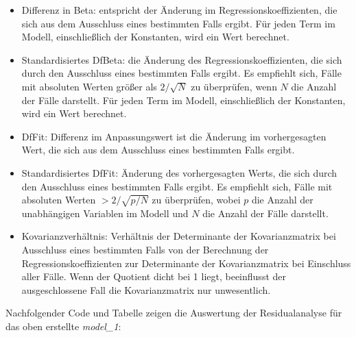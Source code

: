 \documentclass[]{article}
\providecommand{\tightlist}{%
  \setlength{\itemsep}{0pt}\setlength{\parskip}{0pt}}
\begin{document}
\begin{enumerate}
  \begin{itemize}
  \tightlist
  \item
    Differenz in Beta: entspricht der Änderung im
    Regressionskoeffizienten, die sich aus dem Ausschluss eines
    bestimmten Falls ergibt. Für jeden Term im Modell, einschließlich
    der Konstanten, wird ein Wert berechnet.
  \item
    Standardisiertes DfBeta: die Änderung des Regressionskoeffizienten,
    die sich durch den Ausschluss eines bestimmten Falls ergibt. Es
    empfiehlt sich, Fälle mit absoluten Werten größer als \(2/\sqrt{N}\)
    zu überprüfen, wenn \(N\) die Anzahl der Fälle darstellt. Für jeden
    Term im Modell, einschließlich der Konstanten, wird ein Wert
    berechnet.
  \item
    DfFit: Differenz im Anpassungswert ist die Änderung im
    vorhergesagten Wert, die sich aus dem Ausschluss eines bestimmten
    Falls ergibt.
  \item
    Standardisiertes DfFit: Änderung des vorhergesagten Werts, die sich
    durch den Ausschluss eines bestimmten Falls ergibt. Es empfiehlt
    sich, Fälle mit absoluten Werten \(> 2/\sqrt{p/N}\) zu überprüfen,
    wobei \(p\) die Anzahl der unabhängigen Variablen im Modell und
    \(N\) die Anzahl der Fälle darstellt.
  \item
    Kovarianzverhältnis: Verhältnis der Determinante der Kovarianzmatrix
    bei Ausschluss eines bestimmten Falls von der Berechnung der
    Regressionskoeffizienten zur Determinante der Kovarianzmatrix bei
    Einschluss aller Fälle. Wenn der Quotient dicht bei 1 liegt,
    beeinflusst der ausgeschlossene Fall die Kovarianzmatrix nur
    unwesentlich.
  \end{itemize}
\end{enumerate}

Nachfolgender Code und Tabelle zeigen die Auswertung der Residualanalyse
für das oben erstellte \emph{model\_1}:
\end{document}
